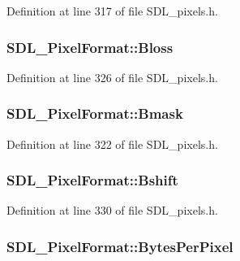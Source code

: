 Definition at line 317 of file S\-D\-L\-\_\-pixels.\-h.

\hypertarget{struct_s_d_l___pixel_format_a337072c1bc8b41efdd2da4e95b8c2ff7}{
\subsubsection[{Bloss}]{ S\-D\-L\-\_\-\-Pixel\-Format\-::\-Bloss}}\label{struct_s_d_l___pixel_format_a337072c1bc8b41efdd2da4e95b8c2ff7}


Definition at line 326 of file S\-D\-L\-\_\-pixels.\-h.

\hypertarget{struct_s_d_l___pixel_format_ad366812df3ae62edb9ae6cb89234fddb}{
\subsubsection[{Bmask}]{ S\-D\-L\-\_\-\-Pixel\-Format\-::\-Bmask}}\label{struct_s_d_l___pixel_format_ad366812df3ae62edb9ae6cb89234fddb}


Definition at line 322 of file S\-D\-L\-\_\-pixels.\-h.

\hypertarget{struct_s_d_l___pixel_format_a4212574b67529628d8822ed4eb109754}{
\subsubsection[{Bshift}]{ S\-D\-L\-\_\-\-Pixel\-Format\-::\-Bshift}}\label{struct_s_d_l___pixel_format_a4212574b67529628d8822ed4eb109754}


Definition at line 330 of file S\-D\-L\-\_\-pixels.\-h.

\hypertarget{struct_s_d_l___pixel_format_a6fec9e1809cc3da458d58b8cccd058f2}{
\subsubsection[{Bytes\-Per\-Pixel}]{ S\-D\-L\-\_\-\-Pixel\-Format\-::\-Bytes\-Per\-Pixel}}\label{struct_s_d_l___pixel_format_a6fec9e1809cc3da458d58b8cccd058f2}


